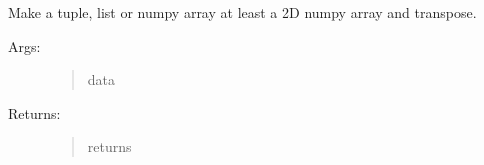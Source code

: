 \documentclass[letterpaper,10pt,english]{sphinxmanual}
\begin{document}
\begin{fulllineitems}
\label{\detokenize{utils:luxpy.utils.helpers.np2dT}}
Make a tuple, list or numpy array at least a 2D numpy array and transpose.
\begin{description}
\item[{Args:}] \leavevmode\begin{quote}\begin{description}
\item[{data}] \leavevmode
{}

\end{description}\end{quote}

\item[{Returns:}] \leavevmode\begin{quote}\begin{description}
\item[{returns}] \leavevmode
{}

\end{description}\end{quote}

\end{description}

\end{fulllineitems}

\end{document}
